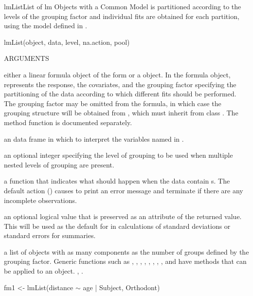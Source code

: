 \documentclass[pdftex]{article} \usepackage{url,graphicx}
\renewcommand{\Twiddle}{\mbox{\(\sim\)}}
\begin{document}
\begin{Helpfile}{lmList}{List of lm Objects with a Common Model}
 is partitioned according to the levels of the grouping
factor  and individual  fits are obtained for each
 partition, using the model defined in .
\begin{Example}
lmList(object, data, level, na.action, pool)
\end{Example}
\begin{Argument}{ARGUMENTS}
\item[\Co{object:}]
either a linear formula object of the form \Co{y {\Twiddle} x1+...+xn | g}
or a  object. In the formula object, 
represents the response,  the covariates, and
 the grouping factor specifying the partitioning of the data
according to which different  fits should be performed. The
grouping factor  may be omitted from the formula, in which
case the grouping structure will be obtained from , which
must inherit from class . The method function 
 is documented separately.
\item[\Co{data:}]
an data frame in which to interpret the variables named in
. 
\item[\Co{level:}]
an optional integer specifying the level of grouping to be used when 
multiple nested levels of grouping are present.
\item[\Co{na.action:}]
a function that indicates what should happen when the
data contain s.  The default action () causes
 to print an error message and terminate if there are any
incomplete observations.
\item[\Co{pool:}]
an optional logical value that is preserved as an attribute of the
returned value.  This will be used as the default for  in
calculations of standard deviations or standard errors for summaries.
\end{Argument}
a list of  objects with as many components as the number of
groups defined by the grouping factor. Generic functions such as
, , , ,
, , , ,
and  have methods that can be applied to an 
object.
, .
\need 15pt
\vspace{-16pt}
\begin{Example}
fm1 <- lmList(distance {\Twiddle} age | Subject, Orthodont)
\end{Example}
\end{Helpfile}
\end{document}
